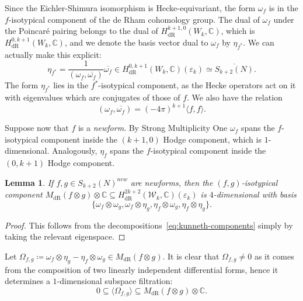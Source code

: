 \documentclass[10pt,a4paper]{amsart}
\newtheorem{lemma}{Lemma}
\newcommand{\KS}{\mathscr{W}}
\newcommand{\C}{\numberset{C}}
\DeclareMathOperator{\dR}{dR}
\renewcommand{\epsilon}{\varepsilon}
\newcommand{\numberset}{\mathbb}
\begin{document}
 Since the Eichler-Shimura isomorphism is Hecke-equivariant, the form $\omega_f$ is in the $f$-isotypical component of the de Rham cohomology group. The dual of $\omega_f$ under the Poincaré pairing belongs to the dual of $H^{k+1,0}_{\dR}(W_k,\C)$, which is $H^{0,k+1}_{\dR}(W_k,\C)$, and we denote the basis vector dual to $\omega_f$ by $\eta_{f^*}$. We can actually make this explicit:
 \[
     \eta_{f^*} = \frac{1}{(\omega_f,\overline{\omega_f})} \overline{\omega_f} \in H^{0,k+1}_{\dR}(W_k,\C)(\epsilon_k) \simeq \overline{S_{k+2}(N)}.
 \]
 The form $\eta_{f^*}$ lies in the $f^*$-isotypical component, as the Hecke operators act on it with eigenvalues which are conjugates of those of $f$. We also have the relation 
 \begin{equation}
  \label{eq:petersson}
  (\omega_f,\overline{\omega_f}) = (-4\pi)^{k+1} \langle f,f \rangle.
 \end{equation}
 
 Suppose now that $f$ is a \emph{newform}. By Strong Multiplicity One $\omega_f$ spans the $f$-isotypical component inside the $(k+1,0)$ Hodge component, which is $1$-dimensional. Analogously, $\eta_f$ spans the $f$-isotypical component inside the $(0,k+1)$ Hodge component.
 
 \begin{lemma}
  If $f,g \in S_{k+2}(N)^{new}$ are newforms, then the $(f,g)$-isotypical component $M_{\dR}(f\otimes g) \otimes \C \subseteq H^{2k+2}_{\dR}(\KS_k, \C)(\epsilon_k)$ is $4$-dimensional with basis
  \[
    \{\omega_f\otimes \omega_g, \omega_f \otimes \eta_g, \eta_f\otimes \omega_g, \eta_f\otimes \eta_g\}.
  \]
 \end{lemma}
 
 \begin{proof}
  This follows from the decompositions~\eqref{eq:kunneth-components} simply by taking the relevant eigenspace.
 \end{proof}

Let $\Omega_{f,g} \coloneqq \omega_f \otimes \eta_g - \eta_f\otimes \omega_g \in M_{\dR}(f\otimes g)$. It is clear that $\Omega_{f,g} \neq 0$ as it comes from the composition of two linearly independent differential forms, hence it determines a $1$-dimensional subspace filtration:
\[
    0 \subseteq \langle \Omega_{f,g} \rangle \subseteq M_{\dR}(f\otimes g) \otimes \C.
\]
\end{document}
